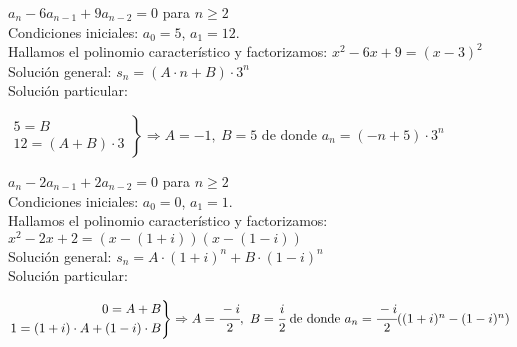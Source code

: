 \begin{ejemplo} $a_{n} - 6a_{n-1} +9a_{n-2} = 0$ para $n \geq 2$ \\
    Condiciones iniciales: $a_{0} = 5$, $a_{1} = 12$.\\
    Hallamos el polinomio característico y factorizamos: $x^2 - 6x + 9 = (x-3)^2$\\
    Solución general: $s_n = (A \cdot n + B) \cdot 3^n$ \\
    Solución particular:
    \begin{center}
        $\left.
            \begin{aligned}
                5 = B \\
                12 = (A + B) \cdot 3
            \end{aligned} \right \}
            \Rightarrow A = -1, \ B = 5 \text{ de donde } a_n = (-n+5) \cdot 3^n$
    \end{center}
\end{ejemplo}
\smallskip

\begin{ejemplo} $a_{n} - 2a_{n-1} +2a_{n-2} = 0$ para $n \geq 2$ \\
    Condiciones iniciales: $a_{0} = 0$, $a_{1} = 1$.\\
    Hallamos el polinomio característico y factorizamos: \\ $x^2 - 2x + 2 = (x-(1+i))(x-(1-i))$\\
    Solución general: $s_{n} = A \cdot (1+i)^{n} + B \cdot (1-i)^{n}$ \\
    Solución particular:
    \begin{center}
        $\left.
            \begin{aligned}
                0 = A + B \\
                1 = (1+i)\cdot A + (1-i)\cdot B
            \end{aligned} \right \}
            \Rightarrow A = \cfrac{-i}{2} , \ B = \cfrac{i}{2}  \text{ de donde }  a_n = \cfrac{-i}{2}((1+i)^n -(1-i)^n)$
    \end{center}
\end{ejemplo}
\smallskip

